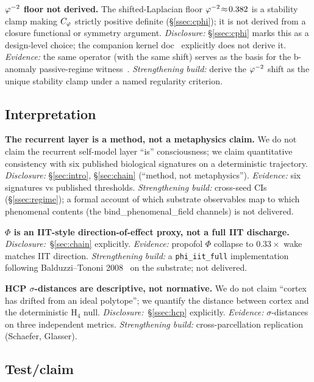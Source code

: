 \textbf{$\varphi^{-2}$ floor not derived.} The shifted-Laplacian floor
$\varphi^{-2}\!\approx\!0.382$ is a stability clamp making $C_{\varphi}$
strictly positive definite (\S\ref{ssec:cphi}); it is not derived
from a closure functional or symmetry argument. \emph{Disclosure:}
\S\ref{ssec:cphi} marks this as a design-level choice; the companion
kernel doc~\citep{SmartAriaClosureKernel2026} explicitly does not
derive it. \emph{Evidence:} the same operator (with the same shift)
serves as the basis for the b-anomaly passive-regime
witness~\citep{SmartBAnomaly2026}. \emph{Strengthening build:}
derive the $\varphi^{-2}$ shift as the unique stability clamp under a
named regularity criterion.

\subsection{Interpretation}\label{ssec:interpretation}

\textbf{The recurrent layer is a method, not a metaphysics claim.}
We do not claim the recurrent self-model layer ``is'' consciousness;
we claim quantitative consistency with six published biological
signatures on a deterministic trajectory. \emph{Disclosure:}
\S\ref{sec:intro}, \S\ref{sec:chain} (``method, not metaphysics'').
\emph{Evidence:} six signatures vs published thresholds.
\emph{Strengthening build:} cross-seed CIs (\S\ref{ssec:regime}); a
formal account of which substrate observables map to which phenomenal
contents (the bind\_phenomenal\_field channels) is not delivered.

\textbf{$\Phi$ is an IIT-style direction-of-effect proxy, not a full
IIT discharge.} \emph{Disclosure:}~\S\ref{sec:chain} explicitly.
\emph{Evidence:} propofol $\Phi$ collapse to $0.33\!\times$ wake
matches IIT direction. \emph{Strengthening build:} a
\texttt{phi\_iit\_full} implementation following Balduzzi--Tononi
2008~\citep{BalduzziTononi2008} on the substrate; not delivered.

\textbf{HCP $\sigma$-distances are descriptive, not normative.} We
do not claim ``cortex has drifted from an ideal polytope''; we
quantify the distance between cortex and the deterministic H$_4$ null.
\emph{Disclosure:}~\S\ref{ssec:hcp} explicitly. \emph{Evidence:}
$\sigma$-distances on three independent metrics. \emph{Strengthening
build:} cross-parcellation replication (Schaefer, Glasser).

\subsection{Test/claim}\label{ssec:testclaim}

